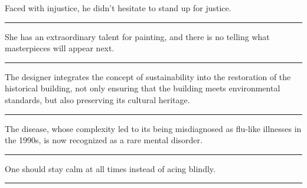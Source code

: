 \documentclass[11pt,a4paper]{article}
\newcommand{\num}[1]{\makebox[1.9em][r]{#1.}\hspace{0.3em}}
\newcommand{\wline}{\noindent\rule{\linewidth}{0.4pt}}
\begin{document}
\vspace{0.35em}\vspace{0.15em}

\begin{minipage}{\linewidth}

\num{29}Faced with injustice, he didn’t hesitate to stand up for justice.

\vspace{0.25em}

\wline

\end{minipage}

\begin{minipage}{\linewidth}

\num{30}She has an extraordinary talent for painting, and there is no telling what masterpieces will appear next.

\vspace{0.25em}

\wline

\end{minipage}

\begin{minipage}{\linewidth}

\num{31}The designer integrates the concept of sustainability into the restoration of the historical building, not only ensuring that the building meets environmental standards, but also preserving its cultural heritage.

\vspace{0.25em}

\wline

\end{minipage}

\begin{minipage}{\linewidth}

\num{32}The disease, whose complexity led to its being misdiagnosed as flu-like illnesses in the 1990s, is now recognized as a rare mental disorder.

\vspace{0.25em}

\wline

\end{minipage}

\vspace{0.35em}\vspace{0.15em}

\begin{minipage}{\linewidth}

\num{33}One should stay calm at all times instead of acing blindly.

\vspace{0.25em}

\wline

\end{minipage}
\end{document}

